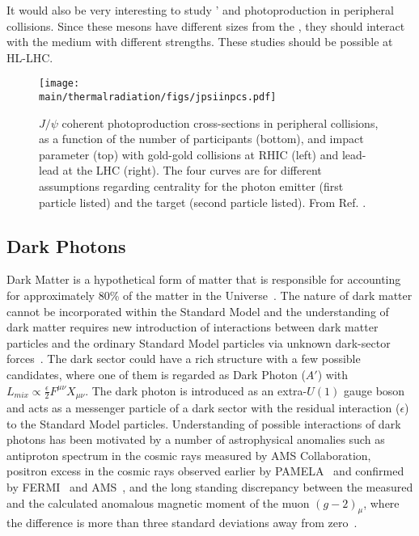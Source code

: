 \documentclass[../report.tex]{subfiles}
\providecommand{\main}{..}
\begin{document}
It would also be very interesting to study \PGy' and \PGU photoproduction in peripheral collisions.  Since these mesons have different sizes from the \PJGy, they should interact with the medium with different strengths.  These studies should be possible at HL-LHC.  

\begin{figure}[htb]
\centering
\texttt{[image: \\main/thermalradiation/figs/jpsiinpcs.pdf]}
\caption{$J/\psi$ coherent photoproduction cross-sections in peripheral collisions, as a function of the number of participants (bottom), and impact parameter (top) with gold-gold collisions at RHIC (left) and lead-lead at the LHC (right).  The four curves are for different assumptions regarding centrality for the photon emitter (first particle listed) and the target (second particle listed).  From Ref. \cite{Zha:2017jch}.}
\label{fig:jpsiinpcs} 
\end{figure}


\subsection{Dark Photons }
\label{sec:dileptons:darkphotons}

Dark Matter is a hypothetical form of matter that is responsible for accounting for approximately 80\% of the matter in the Universe~\cite{Planck:2013jfk}.
The nature of dark matter cannot be incorporated within the Standard Model 
and the understanding of dark matter requires new introduction of interactions 
between dark matter particles 
and the ordinary Standard Model particles via unknown dark-sector forces~\cite{Alexander:2016aln}. 
The dark sector could have a rich structure with a few possible candidates, 
where one of them is regarded as Dark Photon ($A'$) with 
$L_{mix} \propto\frac{\epsilon}{2}F^{\mu\nu}X_{\mu\nu}$.
The dark photon is introduced as an extra-$U(1)$ gauge boson and acts as a messenger particle of a dark sector 
with the residual interaction ($\epsilon$) to the Standard Model particles.
Understanding of possible interactions of dark photons has been motivated by 
a number of astrophysical anomalies such as antiproton spectrum in 
the cosmic rays measured by AMS Collaboration,
positron excess in the cosmic rays observed earlier by PAMELA~\cite{Adriani:2008zr}
and confirmed by FERMI~\cite{FermiLAT:2011ab} and AMS~\cite{Aguilar:2013qda}, 
and the long standing discrepancy
between the measured and the calculated anomalous magnetic moment of 
the muon $(g-2)_{\mu}$, where
the difference is more than three standard deviations away from zero~\cite{Bennett:2006fi}.
\end{document}
